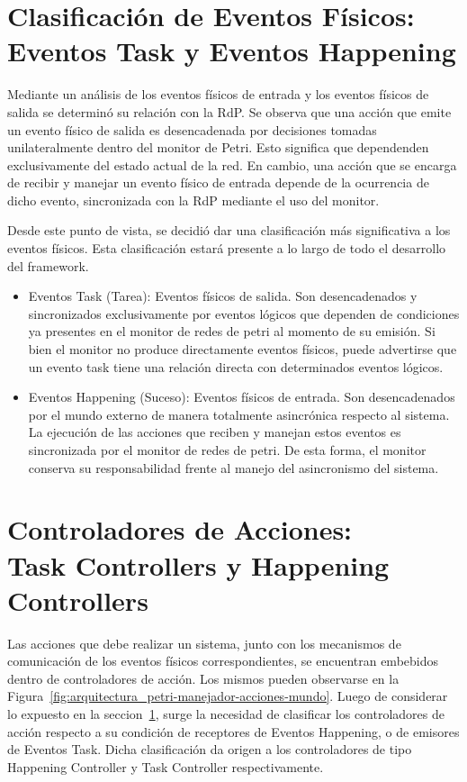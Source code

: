 \section{Clasificación de Eventos Físicos: \\ Eventos Task y Eventos Happening}
\label{sec:clasificacion_eventos_fisicos} 
Mediante un análisis de los eventos físicos de entrada y los eventos
físicos de salida se determinó su relación con la RdP. Se
observa que una acción que emite un evento físico de salida es desencadenada
por decisiones tomadas unilateralmente dentro del monitor de Petri. Esto
significa que dependenden exclusivamente del estado actual de la red.
En cambio, una acción que se encarga de recibir y manejar un evento físico de
entrada depende de la ocurrencia de dicho evento, sincronizada con la RdP
mediante el uso del monitor.

Desde este punto de vista, se decidió dar una clasificación más significativa a
los eventos físicos. Esta clasificación estará presente a lo largo de todo
el desarrollo del framework.
\begin{itemize}
  \item Eventos Task (Tarea): Eventos físicos de salida. Son
  desencadenados y sincronizados exclusivamente por eventos lógicos que dependen
  de condiciones ya presentes en el monitor de redes de petri al momento de su
  emisión. Si bien el monitor no produce directamente eventos físicos, puede
  advertirse que un evento task tiene una relación directa con determinados
  eventos lógicos.
  \item Eventos Happening (Suceso): Eventos físicos de entrada. Son
  desencadenados por el mundo externo de manera totalmente asincrónica respecto
  al sistema. La ejecución de las acciones que reciben y manejan estos eventos
  es sincronizada por el monitor de redes de petri. De esta forma, el monitor
  conserva su responsabilidad frente al manejo del asincronismo del sistema.
\end{itemize}

\section{Controladores de Acciones: \\ Task Controllers y Happening Controllers}
\label{sec:controladores_de_acciones}
Las acciones que debe realizar un sistema, junto con los mecanismos de
comunicación de los eventos físicos correspondientes, se encuentran embebidos
dentro de controladores de acción. Los mismos pueden observarse en la
Figura~\ref{fig:arquitectura_petri-manejador-acciones-mundo}. 
Luego de considerar lo expuesto en la
seccion~\ref{sec:clasificacion_eventos_fisicos}, surge la necesidad de
clasificar los controladores de acción respecto a su condición de receptores de
Eventos Happening, o de emisores de Eventos Task. Dicha clasificación
da origen a los controladores de tipo Happening Controller y Task
Controller respectivamente.

